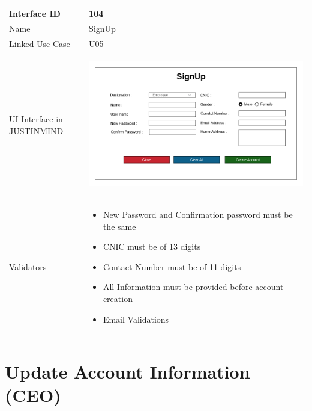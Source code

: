 \documentclass[12pt,a4paper]{report}
\begin{document}
\begin{tabular}{ | m{3cm} | m{12cm}| } \hline

Interface ID &   104 \\\hline

Name  	      &   SignUp\\ \hline

Linked Use Case &  U05\\ \hline

UI Interface in JUSTINMIND & \begin{center} \includegraphics[scale=0.3]{./User Interface/UI-004a Create Account Except Rider@1x.png}\end{center}  \\ \hline

Validators & 
\begin{itemize}
\item   New Password and Confirmation password must be the same
\item  CNIC must be of 13 digits
\item  Contact Number must be of 11 digits
\item  All Information must be provided before account creation
\item  Email Validations


\end{itemize}
\\ \hline

\end{tabular} 

\section{Update Account Information (CEO)}
\end{document}
